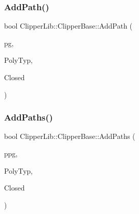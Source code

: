 \mbox{\label{class_clipper_lib_1_1_clipper_base_a7545ac6e146894dc8416887eadd01dba}} 
\subsubsection{\texorpdfstring{AddPath()}{AddPath()}}
{\footnotesize\ttfamily bool Clipper\+Lib\+::\+Clipper\+Base\+::\+Add\+Path (\begin{DoxyParamCaption}\item[{const \mbox{\hyperlink{namespace_clipper_lib_af39c8fe00f278f18cc8142fef41242da}{Path}} \&}]{pg,  }\item[{\mbox{\hyperlink{namespace_clipper_lib_a50d662440e5e100070014ed91281e960}{Poly\+Type}}}]{Poly\+Typ,  }\item[{bool}]{Closed }\end{DoxyParamCaption})\hspace{0.3cm}{\ttfamily [virtual]}}

\mbox{\label{class_clipper_lib_1_1_clipper_base_a2395967b47fb9f3f5846e2bf56c18f67}} 
\subsubsection{\texorpdfstring{AddPaths()}{AddPaths()}}
{\footnotesize\ttfamily bool Clipper\+Lib\+::\+Clipper\+Base\+::\+Add\+Paths (\begin{DoxyParamCaption}\item[{const \mbox{\hyperlink{namespace_clipper_lib_a4bab1d9e10805fa6f1fd3b78c56efcfe}{Paths}} \&}]{ppg,  }\item[{\mbox{\hyperlink{namespace_clipper_lib_a50d662440e5e100070014ed91281e960}{Poly\+Type}}}]{Poly\+Typ,  }\item[{bool}]{Closed }\end{DoxyParamCaption})}

\mbox{\label{class_clipper_lib_1_1_clipper_base_a5690952fe8c2cb047025566405827821}} 
